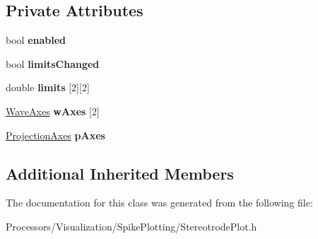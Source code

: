 \subsection*{Private Attributes}
\begin{DoxyCompactItemize}
\item 
\hypertarget{classStereotrodePlot_a78a80fe4052fd96057d142dad3bcb29a}{bool {\bfseries enabled}}\label{classStereotrodePlot_a78a80fe4052fd96057d142dad3bcb29a}

\item 
\hypertarget{classStereotrodePlot_a7178827c495da19c66ed6cc6b5e6ec45}{bool {\bfseries limits\-Changed}}\label{classStereotrodePlot_a7178827c495da19c66ed6cc6b5e6ec45}

\item 
\hypertarget{classStereotrodePlot_a83eb2f6280de73854c2e0893595e741e}{double {\bfseries limits} \mbox{[}2\mbox{]}\mbox{[}2\mbox{]}}\label{classStereotrodePlot_a83eb2f6280de73854c2e0893595e741e}

\item 
\hypertarget{classStereotrodePlot_a0a092dcda7795b10f716f9ab103602a6}{\hyperlink{classWaveAxes}{Wave\-Axes} {\bfseries w\-Axes} \mbox{[}2\mbox{]}}\label{classStereotrodePlot_a0a092dcda7795b10f716f9ab103602a6}

\item 
\hypertarget{classStereotrodePlot_ae9cbecd40fd00bcd8e00576bafe79540}{\hyperlink{classProjectionAxes}{Projection\-Axes} {\bfseries p\-Axes}}\label{classStereotrodePlot_ae9cbecd40fd00bcd8e00576bafe79540}

\end{DoxyCompactItemize}
\subsection*{Additional Inherited Members}


The documentation for this class was generated from the following file\-:\begin{DoxyCompactItemize}
\item 
Processors/\-Visualization/\-Spike\-Plotting/Stereotrode\-Plot.\-h\end{DoxyCompactItemize}
